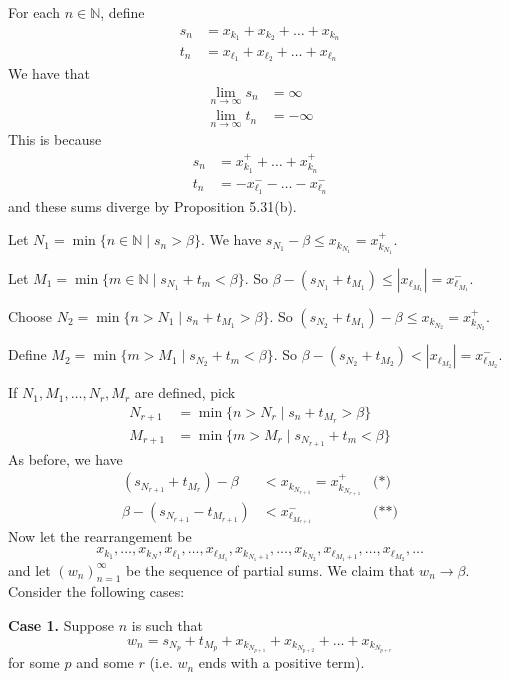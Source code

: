 \documentclass[11pt]{article}
\theoremstyle{definition}
\newcommand{\mbN}{\ensuremath{\mathbb{N}}}
\begin{document}
For each $n \in \mbN$, define
\begin{align*}
s_n & = x_{k_1} + x_{k_2} + \dots + x_{k_n} \\
t_n & = x_{\ell_1} + x_{\ell_2} + \dots + x_{\ell_n}
\end{align*}
We have that
\begin{align*}
\lim_{n\to\infty} s_n & = \infty \\
\lim_{n\to\infty} t_n & = -\infty
\end{align*}
This is because
\begin{align*}
s_n & = x_{k_1}^+ + \dots + x_{k_n}^+ \\
t_n & = - x_{\ell_1}^- - \dots - x_{\ell_n}^-
\end{align*}
and these sums diverge by Proposition 5.31(b).

Let $N_1 = \min\{n \in \mbN \mid s_n > \beta\}$. 
We have $s_{N_1} - \beta \leq x_{k_{N_1}} = x_{k_{N_1}}^+$. 

Let $M_1 = \min\{m \in \mbN \mid s_{N_1} + t_m < \beta\}$. 
So $\beta - (s_{N_1} + t_{M_1}) \leq |x_{\ell_{M_1}}| = x_{\ell_{M_1}}^-$.

Choose $N_2 = \min\{n > N_1 \mid s_n + t_{M_1} > \beta\}$.
So $(s_{N_2} + t_{M_1}) - \beta \leq x_{k_{N_2}} = x_{k_{N_2}}^+$.

Define $M_2 = \min\{m > M_1 \mid s_{N_2} + t_m < \beta\}$.
So $\beta - (s_{N_2} + t_{M_2}) < |x_{\ell_{M_2}}| = x_{\ell_{M_2}}^-$.

If $N_1, M_1, \dots, N_r, M_r$ are defined, pick
\begin{align*}
N_{r+1} & = \min\{n > N_r \mid s_n + t_{M_r} > \beta\} \\
M_{r+1} & = \min\{m > M_r \mid s_{N_{r+1}} + t_m < \beta\}
\end{align*}
As before, we have
\begin{align*}
(s_{N_{r+1}} + t_{M_r}) - \beta & < x_{k_{N_{r+1}}} = x_{k_{N_{r+1}}}^+ & \text{(*)} \\
\beta - (s_{N_{r+1}} - t_{M_{r+1}}) & < x_{\ell_{M_{r+1}}}^- & \text{(**)}
\end{align*}
Now let the rearrangement be
$$x_{k_1}, \dots, x_{k_N}, x_{\ell_1}, \dots, x_{\ell_{M_1}}, x_{k_{N_1+1}}, \dots, x_{k_{N_2}}, x_{\ell_{M_1+1}}, \dots, x_{\ell_{M_2}}, \dots$$
and let $(w_n)_{n=1}^\infty$ be the sequence of partial sums. We claim that $w_n \to \beta$. Consider the following cases: 

\textbf{Case 1.} Suppose $n$ is such that
$$w_n = s_{N_p} + t_{M_p} + x_{k_{N_{p+1}}} + x_{k_{N_{p+2}}} + \dots + x_{k_{N_{p+r}}}$$
for some $p$ and some $r$ (i.e. $w_n$ ends with a positive term).
\end{document}
